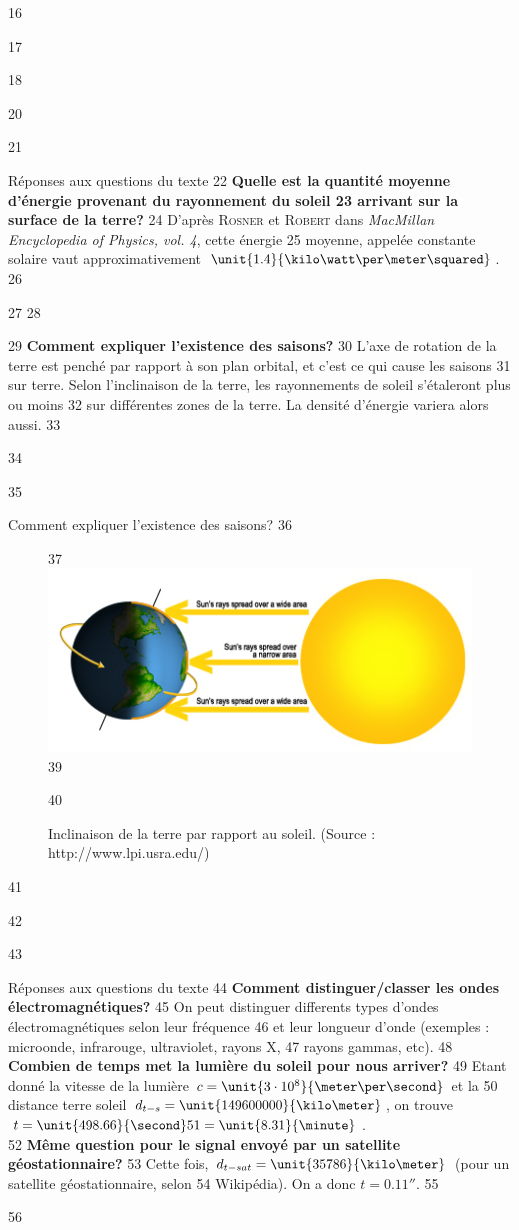 \documentclass[pdf]{beamer}
\begin{document}
 
16 
 
17 \begin{frame} 
18 	 \end{frame} 
20 
 
21 \begin{frame}{Réponses aux questions du texte} 
22 \textbf{Quelle est la quantité moyenne d'énergie provenant du rayonnement du soleil 
23 arrivant sur la surface de la terre?} 
24 D'après \textsc{Rosner} et \textsc{Robert} dans \textit{MacMillan Encyclopedia of Physics, vol. 4}, cette énergie  
25 moyenne, appelée constante solaire vaut approximativement $\unit{1.4}{\kilo\watt\per\meter\squared}$. 
26 
 
27 %
28 
 
29 \textbf{Comment expliquer l'existence des saisons?} 
30 L'axe de rotation de la terre est penché par rapport à son plan orbital, et c'est ce qui cause les saisons 
31 sur terre. Selon l'inclinaison de la terre, les rayonnements de soleil s'étaleront plus ou moins 
32 sur différentes zones de la terre. La densité d'énergie variera alors aussi. 
33 \end{frame} 
34 
 
35 \begin{frame}{Comment expliquer l'existence des saisons?} 
36 	\begin{figure}[ht!] 
37          \includegraphics[scale=0.75]{whyseasons.jpg} 
39 		\caption{Inclinaison de la terre par rapport au soleil. (Source : http://www.lpi.usra.edu/)} 
40 	\end{figure} 
41 \end{frame} 
42 
 
43 \begin{frame}{Réponses aux questions du texte} 
44 \textbf{Comment distinguer/classer les ondes électromagnétiques?} 
45 On peut distinguer differents types d'ondes électromagnétiques selon leur fréquence 
46 et leur longueur d'onde (exemples : microonde, infrarouge, ultraviolet, rayons X,  
47 rayons gammas, etc). 
48 \textbf{Combien de temps met la lumière du soleil pour nous arriver?} 
49 Etant donné la vitesse de la lumière $c = \unit{3 \cdot 10^8}{\meter\per\second}$ et la 
50 distance terre soleil $d_{t-s} = \unit{149600000}{\kilo\meter}$, on trouve $t = \unit{498.66}{\second} 
51 = \unit{8.31}{\minute}$. \\ 
52 \textbf{Même question pour le signal envoyé par un satellite géostationnaire?} 
53 Cette fois, $d_{t-sat} = \unit{35786}{\kilo\meter}$ (pour un satellite géostationnaire, selon 
54 Wikipédia). On a donc $t = \unit{0.11}{\second}$. 
55 \end{frame} 
56 
 
\end{document}
